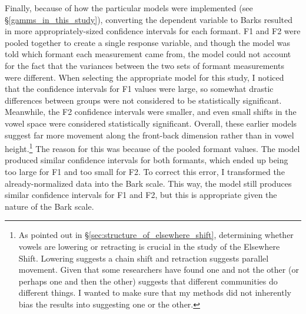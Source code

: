 Finally, because of how the particular models were implemented (see \S\ref{gamms_in_this_study}), converting the dependent variable to Barks resulted in more appropriately-sized confidence intervals for each formant. F1 and F2 were pooled together to create a single response variable, and though the model was told which formant each measurement came from, the model could not account for the fact that the variances between the two sets of formant measurements were different. When selecting the appropriate model for this study, I noticed that the confidence intervals for F1 values were large, so somewhat drastic differences between groups were not considered to be statistically significant. Meanwhile, the F2 confidence intervals were smaller, and even small shifts in the vowel space were considered statistically significant. Overall, these earlier models suggest far more movement along the front-back dimension rather than in vowel height.\footnote{As pointed out in \S\ref{sec:structure_of_elsewhere_shift}, determining whether vowels are lowering or retracting is crucial in the study of the Elsewhere Shift. Lowering suggests a chain shift and retraction suggests parallel movement. Given that some researchers have found one and not the other (or perhaps one and then the other) suggests that different communities do different things. I wanted to make sure that my methods did not inherently bias the results into suggesting one or the other.} The reason for this was because of the pooled formant values. The model produced similar confidence intervals for both formants, which ended up being too large for F1 and too small for F2. To correct this error, I transformed the already-normalized data into the Bark scale. This way, the model still produces similar confidence intervals for F1 and F2, but this is appropriate given the nature of the Bark scale.

